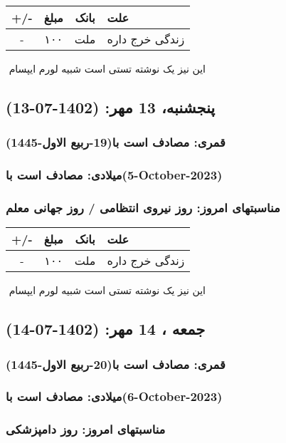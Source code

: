 \documentclass{article}
\newcommand{\rnote}[1]{\marginpar{\textcolor{color}{\StrSubstitute{\##1}{ }{\_}}}}
\newcommand{\myRow}[4]{
    #1 & #2 & #3 & #4 \\ \hline
}
\begin{document}
\begin{tabular}{ | c | c | c | p{5cm} |}
    \hline
    \myRow{ +/- }{مبلغ}{بانک}{علت}
    \myRow{-}{۱۰۰}{ملت}{زندگی خرج داره}
\end{tabular}
\newline
\newline

‌
\rnote{تست}
این نیز یک نوشته تستی است شبیه لورم ایپسام




\newpage
{}
\textcolor{color}{
\section{ پنجشنبه، 13 مهر: (1402-07-13) }
\subsubsection*{قمری: مصادف است با(19-ربیع الاول-1445)} 
\subsubsection*{میلادی: مصادف است با(5-October-2023)}
\subsubsection*{مناسبتهای امروز: روز نیروی انتظامی / روز جهانی معلم}
}


\begin{tabular}{ | c | c | c | p{5cm} |}
    \hline
    \myRow{ +/- }{مبلغ}{بانک}{علت}
    \myRow{-}{۱۰۰}{ملت}{زندگی خرج داره}
\end{tabular}
\newline
\newline

‌
\rnote{تست}
این نیز یک نوشته تستی است شبیه لورم ایپسام




\newpage
{}
\textcolor{color}{
\section{ جمعه ، 14 مهر: (1402-07-14) }
\subsubsection*{قمری: مصادف است با(20-ربیع الاول-1445)} 
\subsubsection*{میلادی: مصادف است با(6-October-2023)}
\subsubsection*{مناسبتهای امروز: روز دامپزشکی}
}
\end{document}
